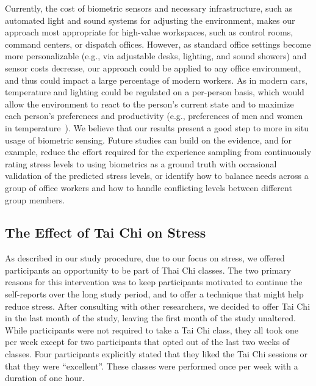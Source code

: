 Currently, the cost of biometric sensors and necessary infrastructure,
such as automated light and sound systems for adjusting the
environment, makes our approach most appropriate for high-value
workspaces, such as control rooms, command centers, or dispatch
offices. However, as standard office settings become more
personalizable (e.g., via adjustable desks, lighting, and sound
showers) and sensor costs decrease, our approach could be applied to
any office environment, and thus could impact a large percentage of
modern workers. As in modern cars, temperature and lighting could be
regulated on a per-person basis, which would allow the environment to
react to the person's current state and to maximize each person's
preferences and productivity (e.g., preferences of men and women in
temperature~\cite{Karjalainen07}). 
We believe that our results present a good step to more in situ usage of biometric sensing. Future studies can build on the evidence, and for example, reduce the effort required for the experience sampling from continuously rating stress levels to using biometrics as a ground truth with occasional validation of the predicted stress levels, or
identify how to balance needs across a group of office workers and how
to handle conflicting levels between different group members.




\subsection{The Effect of Tai Chi on Stress}

\vspace{-4mm}
As described in our study procedure,
due to our focus on stress, we offered participants an opportunity to be part of Thai Chi classes.
The two primary reasons for this intervention was to keep participants motivated to continue the self-reports over the long study period, and to offer a technique that might help reduce stress.
After consulting with other researchers, we decided to offer Tai Chi in the last month of the study, leaving the first month of the study unaltered. While participants were not required to take a Tai Chi class, they all took one per week except for two participants that opted out of the last two weeks of classes. Four participants explicitly stated that they liked the Tai Chi sessions or that they were ``excellent''.
These classes were performed once per week with a duration of one hour.

